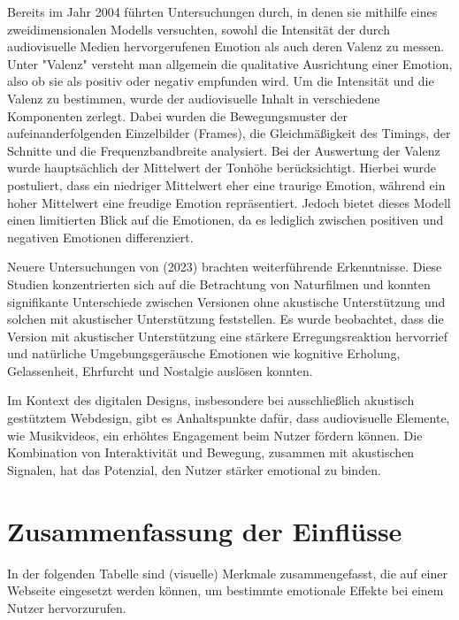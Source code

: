 \documentclass[./dokumentation.tex]{subfiles}
\begin{document}
Bereits im Jahr 2004 führten \cite{1386249} Untersuchungen durch, in denen sie mithilfe eines zweidimensionalen Modells versuchten, sowohl die Intensität der durch audiovisuelle Medien hervorgerufenen Emotion als auch deren Valenz zu messen. Unter "Valenz" versteht man allgemein die qualitative Ausrichtung einer Emotion, also ob sie als positiv oder negativ empfunden wird. Um die Intensität und die Valenz zu bestimmen, wurde der audiovisuelle Inhalt in verschiedene Komponenten zerlegt. Dabei wurden die Bewegungsmuster der aufeinanderfolgenden Einzelbilder (Frames), die Gleichmäßigkeit des Timings, der Schnitte und die Frequenzbandbreite analysiert. Bei der Auswertung der Valenz wurde hauptsächlich der Mittelwert der Tonhöhe berücksichtigt. Hierbei wurde postuliert, dass ein niedriger Mittelwert eher eine traurige Emotion, während ein hoher Mittelwert eine freudige Emotion repräsentiert. Jedoch bietet dieses Modell einen limitierten Blick auf die Emotionen, da es lediglich zwischen positiven und negativen Emotionen differenziert. 

Neuere Untersuchungen von \cite{SMALLEY2023102060} (2023) brachten weiterführende Erkenntnisse. Diese Studien konzentrierten sich auf die Betrachtung von Naturfilmen und konnten signifikante Unterschiede zwischen Versionen ohne akustische Unterstützung und solchen mit akustischer Unterstützung feststellen. Es wurde beobachtet, dass die Version mit akustischer Unterstützung eine stärkere Erregungsreaktion hervorrief und natürliche Umgebungsgeräusche Emotionen wie kognitive Erholung, Gelassenheit, Ehrfurcht und Nostalgie auslösen konnten. 

Im Kontext des digitalen Designs, insbesondere bei ausschließlich akustisch gestütztem Webdesign, gibt es Anhaltspunkte dafür, dass audiovisuelle Elemente, wie Musikvideos, ein erhöhtes Engagement beim Nutzer fördern können. Die Kombination von Interaktivität und Bewegung, zusammen mit akustischen Signalen, hat das Potenzial, den Nutzer stärker emotional zu binden.


\section{Zusammenfassung der Einflüsse} 
In der folgenden Tabelle sind (visuelle) Merkmale zusammengefasst, die auf einer Webseite eingesetzt werden können, um bestimmte emotionale Effekte bei einem Nutzer hervorzurufen. \\
\end{document}
